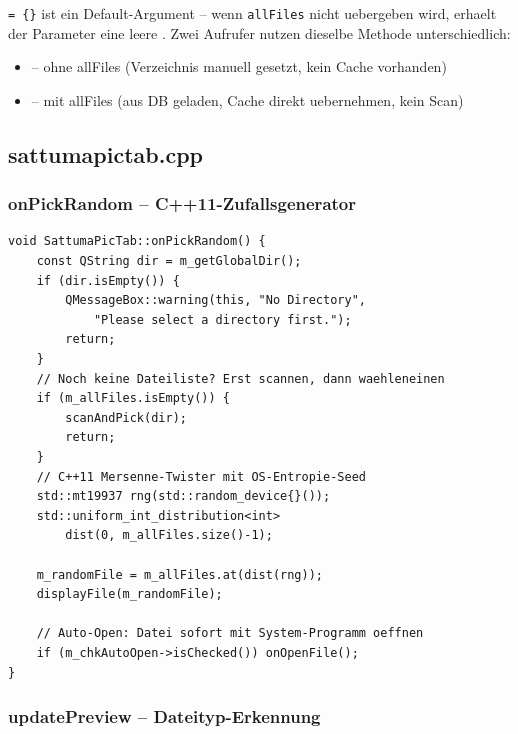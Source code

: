 \verb|= {}| ist ein Default-Argument -- wenn
\verb|allFiles| nicht uebergeben wird, erhaelt der
Parameter eine leere .
Zwei Aufrufer nutzen dieselbe Methode unterschiedlich:
\begin{itemize}[noitemsep]
  \item {} -- ohne allFiles
    (Verzeichnis manuell gesetzt, kein Cache vorhanden)
  \item {} -- mit allFiles
    (aus DB geladen, Cache direkt uebernehmen, kein Scan)
\end{itemize}

\subsection{sattumapictab.cpp}

\subsubsection{onPickRandom -- C++11-Zufallsgenerator}

\begin{lstlisting}[caption={onPickRandom: Zufallsauswahl und Auto-Open}]
void SattumaPicTab::onPickRandom() {
    const QString dir = m_getGlobalDir();
    if (dir.isEmpty()) {
        QMessageBox::warning(this, "No Directory",
            "Please select a directory first.");
        return;
    }
    // Noch keine Dateiliste? Erst scannen, dann waehleneinen
    if (m_allFiles.isEmpty()) {
        scanAndPick(dir);
        return;
    }
    // C++11 Mersenne-Twister mit OS-Entropie-Seed
    std::mt19937 rng(std::random_device{}());
    std::uniform_int_distribution<int>
        dist(0, m_allFiles.size()-1);

    m_randomFile = m_allFiles.at(dist(rng));
    displayFile(m_randomFile);

    // Auto-Open: Datei sofort mit System-Programm oeffnen
    if (m_chkAutoOpen->isChecked()) onOpenFile();
}
\end{lstlisting}

\subsubsection{updatePreview -- Dateityp-Erkennung}

